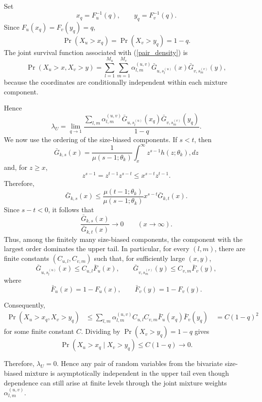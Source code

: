 \documentclass[11pt]{article}
\begin{document}
Set
\[
x_q=F_u^{-1}(q),\qquad y_q=F_v^{-1}(q).
\]
Since $F_u(x_q)=F_v(y_q)=q$,
\[
\Pr(X_u>x_q)=\Pr(X_v>y_q)=1-q.
\]
The joint survival function associated with (\ref{pair_density}) is 
\[ \Pr(X_u>x,X_v>y) = 
\sum_{l=1}^{M_u}\sum_{m=1}^{M_v} \alpha^{(u,v)}_{l,m} \bar G_{u,s_l^{(u)}}(x) \bar G_{v,s_m^{(v)}}(y), 
\] 
because the coordinates are conditionally independent within each mixture component. 

Hence 
\[ \lambda_U = 
\lim_{q\to1}
\frac{
\sum_{l,m}\alpha^{(u,v)}_{l,m}
\bar G_{u,s_l^{(u)}}(x_q)
\bar G_{v,s_m^{(v)}}(y_q)
}{1-q}.
\]
We now use the ordering of the size-biased components. If $s<t$, then 
\[ \bar G_{k,s}(x) =
\frac{1}{\mu(s-1;\theta_k)}
\int_x^\infty z^{s-1}h(z;\theta_k),dz
\]
and, for $z\ge x$,
\[
z^{s-1}
=z^{t-1}z^{s-t}
\le x^{s-t}z^{t-1}.
\]
Therefore,
\[
\bar G_{k,s}(x)
\le
\frac{\mu(t-1;\theta_k)}
{\mu(s-1;\theta_k)}
x^{s-t}\bar G_{k,t}(x).
\]
Since $s-t<0$, it follows that
\[
\frac{\bar G_{k,s}(x)}{\bar G_{k,t}(x)}
\longrightarrow 0
\qquad (x\to\infty).
\]
Thus, among the finitely many size-biased components, the component with the largest order dominates the upper tail. In particular, for every $(l,m)$, there are finite constants $(C_{u,l},C_{v,m})$ such that, for sufficiently large $(x,y)$,
\[
\bar G_{u,s_l^{(u)}}(x)\le C_{u,l}\bar F_u(x),
\qquad
\bar G_{v,s_m^{(v)}}(y)\le C_{v,m}\bar F_v(y),
\]
where
\[
\bar F_u(x)=1-F_u(x),\qquad
\bar F_v(y)=1-F_v(y).
\]

Consequently,
\[
\begin{aligned}
\Pr(X_u>x_q,X_v>y_q)
&\le
\sum_{l,m}\alpha^{(u,v)}_{l,m}
C_{u,l}C_{v,m}
\bar F_u(x_q)\bar F_v(y_q)\
&=C(1-q)^2
\end{aligned}
\]
for some finite constant $C$. Dividing by $\Pr(X_v>y_q)= 1-q$ gives
\[
\Pr(X_u>x_q\mid X_v>y_q)
\le C(1-q)\longrightarrow 0.
\]

Therefore,  $\lambda_U=0$. Hence any pair of random variables from the bivariate size-biased mixture is asymptotically independent in the upper tail even though dependence can still arise at finite levels through the joint mixture weights $\alpha^{(u,v)}_{l,m}$.
\end{document}
